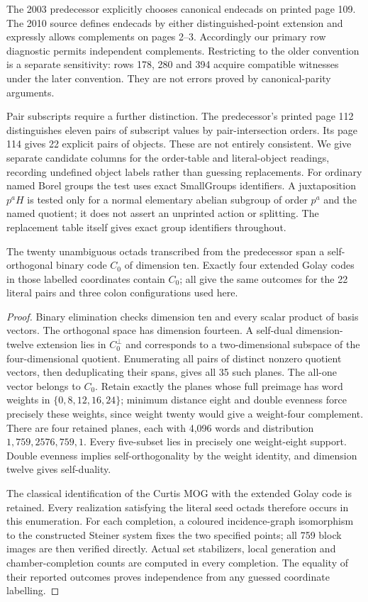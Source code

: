 \documentclass[11pt,a4paper]{article}
\begin{document}
The 2003 predecessor explicitly chooses canonical endecads on printed page 109. The 2010 source defines endecads by either distinguished-point extension and expressly allows complements on pages 2--3. Accordingly our primary row diagnostic permits independent complements. Restricting to the older convention is a separate sensitivity: rows 178, 280 and 394 acquire compatible witnesses under the later convention. They are not errors proved by canonical-parity arguments.

Pair subscripts require a further distinction. The predecessor's printed page 112 distinguishes eleven pairs of subscript values by pair-intersection orders. Its page 114 gives 22 explicit pairs of objects. These are not entirely consistent. We give separate candidate columns for the order-table and literal-object readings, recording undefined object labels rather than guessing replacements. For ordinary named Borel groups the test uses exact SmallGroups identifiers. A juxtaposition $p^aH$ is tested only for a normal elementary abelian subgroup of order $p^a$ and the named quotient; it does not assert an unprinted action or splitting. The replacement table itself gives exact group identifiers throughout.

\begin{lemma}\label{lem:codes}
The twenty unambiguous octads transcribed from the predecessor span a self-orthogonal binary code $C_0$ of dimension ten. Exactly four extended Golay codes in those labelled coordinates contain $C_0$; all give the same outcomes for the 22 literal pairs and three colon configurations used here.
\end{lemma}
\begin{proof}
Binary elimination checks dimension ten and every scalar product of basis vectors. The orthogonal space has dimension fourteen. A self-dual dimension-twelve extension lies in $C_0^\perp$ and corresponds to a two-dimensional subspace of the four-dimensional quotient. Enumerating all pairs of distinct nonzero quotient vectors, then deduplicating their spans, gives all 35 such planes. The all-one vector belongs to $C_0$. Retain exactly the planes whose full preimage has word weights in $\{0,8,12,16,24\}$; minimum distance eight and double evenness force precisely these weights, since weight twenty would give a weight-four complement. There are four retained planes, each with 4,096 words and distribution $1,759,2576,759,1$. Every five-subset lies in precisely one weight-eight support. Double evenness implies self-orthogonality by the weight identity, and dimension twelve gives self-duality.

The classical identification of the Curtis MOG with the extended Golay code is retained. Every realization satisfying the literal seed octads therefore occurs in this enumeration. For each completion, a coloured incidence-graph isomorphism to the constructed Steiner system fixes the two specified points; all 759 block images are then verified directly. Actual set stabilizers, local generation and chamber-completion counts are computed in every completion. The equality of their reported outcomes proves independence from any guessed coordinate labelling.
\end{proof}
\end{document}
